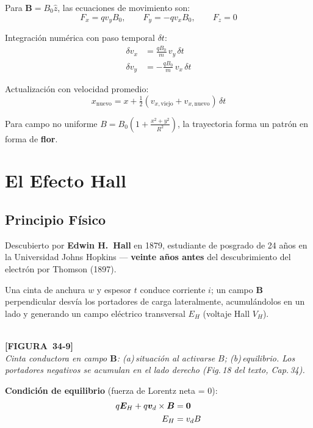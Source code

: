 \documentclass[12pt, letterpaper]{report}
\numberwithin{equation}{section}
\newcommand{\vB}[1]{\boldsymbol{#1}}          %
\newcommand{\figplaceholder}[2]{%
  \begin{tcolorbox}[figbox]
    \centering
    \textcolor{NavyBlue!50}{\rule{0pt}{2.8cm}}\\[4pt]
    {\small\color{NavyBlue}\textbf{[FIGURA\ #1]}\\[2pt]
    \textit{#2}}
  \end{tcolorbox}
}
\begin{document}
Para $\vB{B}=B_0\hat{z}$, las ecuaciones de movimiento son:
\[
  F_x = qv_yB_0,\qquad F_y = -qv_xB_0,\qquad F_z=0
\]

Integración numérica con paso temporal $\delta t$:
\begin{align}
  \delta v_x &= \frac{qB_0}{m}\,v_y\,\delta t \\[4pt]
  \delta v_y &= -\frac{qB_0}{m}\,v_x\,\delta t
\end{align}

Actualización con velocidad promedio:
\[
  x_\text{nuevo} = x + \tfrac{1}{2}(v_{x,\text{viejo}}+v_{x,\text{nuevo}})\,\delta t
\]

Para campo no uniforme
$B=B_0\!\left(1+\tfrac{x^2+y^2}{R^2}\right)$, la trayectoria forma un
patrón en forma de \textbf{flor}.

\section{El Efecto Hall}

\subsection{Principio Físico}

\begin{tcolorbox}[notebox, title=Contexto histórico]
  Descubierto por \textbf{Edwin H.\ Hall} en 1879, estudiante de posgrado
  de 24 años en la Universidad Johns Hopkins — \textbf{veinte años antes}
  del descubrimiento del electrón por Thomson (1897).
\end{tcolorbox}

Una cinta de anchura $w$ y espesor $t$ conduce corriente $i$; un campo
$\vB{B}$ perpendicular desvía los portadores de carga lateralmente,
acumulándolos en un lado y generando un campo eléctrico transversal
$E_H$ (voltaje Hall $V_H$).

\figplaceholder{34-9}{Cinta conductora en campo $\vB{B}$: (a)\,situación
al activarse $B$; (b)\,equilibrio. Los portadores negativos
se acumulan en el lado derecho (Fig.\,18 del texto, Cap.\,34).}

\textbf{Condición de equilibrio} (fuerza de Lorentz neta = 0):
\begin{align}
  q\vB{E}_H + q\vB{v}_d\times\vB{B} &= \vB{0} \notag\\
  E_H &= v_d B \label{eq:HallEq}
\end{align}
\end{document}
